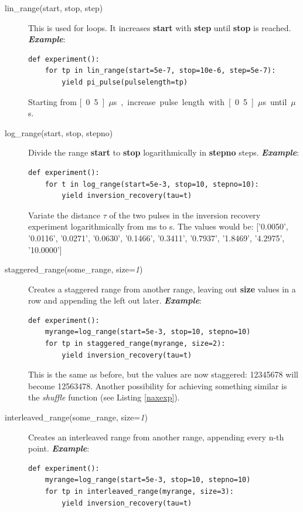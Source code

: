 \documentclass[12pt, a4paper, BCOR10mm, twoside, titlepage, headinclude]{scrbook}
\begin{document}
\begin{description}

\item[lin\_range(start, stop, step)] This is used for loops. It increases \textbf{start} with \textbf{step} until \textbf{stop} is reached.
\newline
\emph{\textbf{Example}}:
\begin{lstlisting}
def experiment():
	for tp in lin_range(start=5e-7, stop=10e-6, step=5e-7):
		yield pi_pulse(pulselength=tp)
\end{lstlisting}
Starting from \unit[0.5]{$\mu$s}, increase pulse length with \unit[0.5]{$\mu$s} until \unit[10]{$\mu$s}.



\item[log\_range(start, stop, stepno)] Divide the range \textbf{start} to \textbf{stop} logarithmically in \textbf{stepno} steps.
\newline
\emph{\textbf{Example}}:
\begin{lstlisting}
def experiment():
	for t in log_range(start=5e-3, stop=10, stepno=10):
		yield inversion_recovery(tau=t)
\end{lstlisting}
Variate the distance $\tau$ of the two pulses in the inversion recovery experiment logarithmically from \unit[5]{ms} to \unit[10]{s}. The values would be:
['0.0050', '0.0116', '0.0271', '0.0630', '0.1466', '0.3411',
       '0.7937', '1.8469', '4.2975', '10.0000']
       
       
\item[staggered\_range(some\_range, size=\textit{1})] Creates a staggered range from another range, leaving out \textbf{size} values in a row and appending the left  out  later.
\newline
\emph{\textbf{Example}}:
\begin{lstlisting}
def experiment():
	myrange=log_range(start=5e-3, stop=10, stepno=10)
	for tp in staggered_range(myrange, size=2):
		yield inversion_recovery(tau=t)
\end{lstlisting}
This is the same as before, but the values are now staggered: 12345678 will become 12563478. Another possibility for achieving something similar is the \emph{shuffle} function (see Listing \ref{naxexp}).

\item[interleaved\_range(some\_range, size=\textit{1})] Creates an interleaved range from another range, appending every n-th point.
\newline
\emph{\textbf{Example}}:
\begin{lstlisting}
def experiment():
	myrange=log_range(start=5e-3, stop=10, stepno=10)
	for tp in interleaved_range(myrange, size=3):
		yield inversion_recovery(tau=t)
\end{lstlisting}


\end{description}
\end{document}
